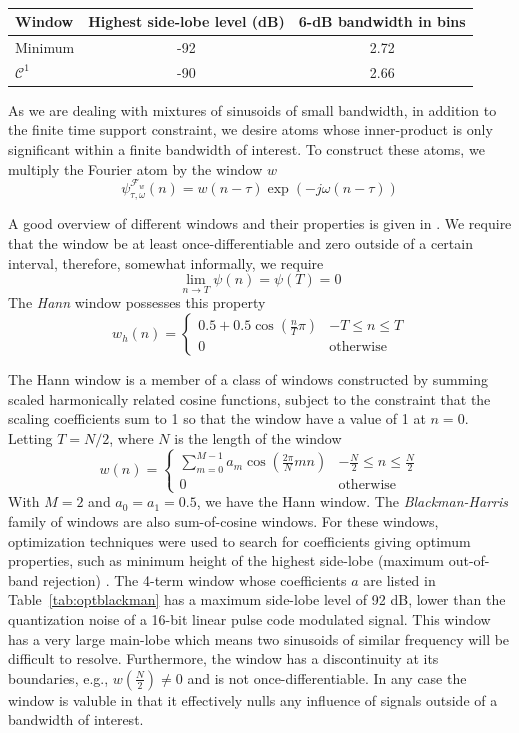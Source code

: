 \begin{table}
    \caption{\label{tab:optvs4termblackman}}
    \begin{center}
        \begin{tabular}{l c c}
            Window & Highest side-lobe level (dB) & 6-dB bandwidth in bins \\
            \hline
            Minimum & -92 & 2.72 \\
            $\mathcal{C}^{1}$ & -90 & 2.66 \\
        \end{tabular}
    \end{center}
\end{table}

As we are dealing with mixtures of sinusoids of small bandwidth, in addition to
the finite time support constraint, we desire atoms whose inner-product is only
significant within a finite bandwidth of interest. To construct these atoms, we
multiply the Fourier atom by the window $w$
\[
    \psi_{\tau,\omega}^{\mathcal{F}_{w}}(n) = w(n-\tau) \exp(-j\omega(n-\tau))
\]

A good overview of different windows and their properties is given in
\cite{harris1978use}. We require that the window be at least
once-differentiable and zero outside of a certain interval, therefore, somewhat
informally, we require
\[
    \lim_{n \rightarrow T} \psi(n) = \psi(T) = 0
\]
The \textit{Hann} window possesses this property
\[
    w_{h}(n) = \begin{cases}
        0.5 + 0.5 \cos \left( \frac{n}{T}\pi \right) & -T \leq n \leq T \\
        0 & \text{otherwise}
    \end{cases}
\]

The Hann window is a member of a class of windows constructed by summing scaled
harmonically related cosine functions, subject to the constraint that the
scaling coefficients sum to 1 so that the window have a value of 1 at $n=0$.
Letting $T=N/2$, where $N$ is the length of the window
\[
    w(n) = \begin{cases}
        \sum_{m=0}^{M-1}a_{m}\cos \left( \frac{2\pi}{N}mn \right) & -\frac{N}{2} \leq n
        \leq \frac{N}{2} \\
        0 & \text{otherwise}
    \end{cases}
\]
With $M=2$ and $a_0 = a_1 = 0.5$, we have the Hann window. The
\textit{Blackman-Harris} family of windows are also sum-of-cosine windows. For
these windows, optimization techniques were used to search for coefficients
giving optimum properties, such as minimum height of the highest side-lobe
(maximum out-of-band rejection) \cite{rabiner1970approach}. The 4-term window
whose coefficients $a$ are listed in Table~\ref{tab:optblackman} has a maximum
side-lobe level of 92 dB, lower than the quantization noise of a 16-bit linear
pulse code modulated signal. This window has a very large main-lobe which means
two sinusoids of similar frequency will be difficult to resolve. Furthermore,
the window has a discontinuity at its boundaries, e.g.,
$w \left( \frac{N}{2} \right) \neq 0$ and is not once-differentiable. In any
case the window is valuble in that it effectively nulls any influence of signals
outside of a bandwidth of interest.

